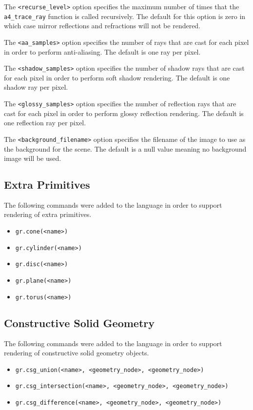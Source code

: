 The \verb|<recurse_level>| option specifies the maximum number of times that the
\verb|a4_trace_ray| function is called recursively. The default for this option
is zero in which case mirror reflections and refractions will not be rendered.

The \verb|<aa_samples>| option specifies the number of rays that are cast for each
pixel in order to perform anti-aliasing. The default is one ray per pixel.

The \verb|<shadow_samples>| option specifies the number of shadow rays that are
cast for each pixel in order to perform soft shadow rendering. The default is
one shadow ray per pixel.

The \verb|<glossy_samples>| option specifies the number of reflection rays that
are cast for each pixel in order to perform glossy reflection rendering. The
default is one reflection ray per pixel.

The \verb|<background_filename>| option specifies the filename of the image to
use as the background for the scene. The default is a null value meaning no
background image will be used.

\subsection*{Extra Primitives}
The following commands were added to the language in order to support rendering
of extra primitives.
\begin{itemize}
  \item \verb|gr.cone(<name>)|
  \item \verb|gr.cylinder(<name>)|
  \item \verb|gr.disc(<name>)|
  \item \verb|gr.plane(<name>)|
  \item \verb|gr.torus(<name>)|
\end{itemize}

\subsection*{Constructive Solid Geometry}
The following commands were added to the language in order to support rendering
of constructive solid geometry objects.
\begin{itemize}
  \item \verb|gr.csg_union(<name>, <geometry_node>, <geometry_node>)|
  \item \verb|gr.csg_intersection(<name>, <geometry_node>, <geometry_node>)|
  \item \verb|gr.csg_difference(<name>, <geometry_node>, <geometry_node>)|
\end{itemize}

